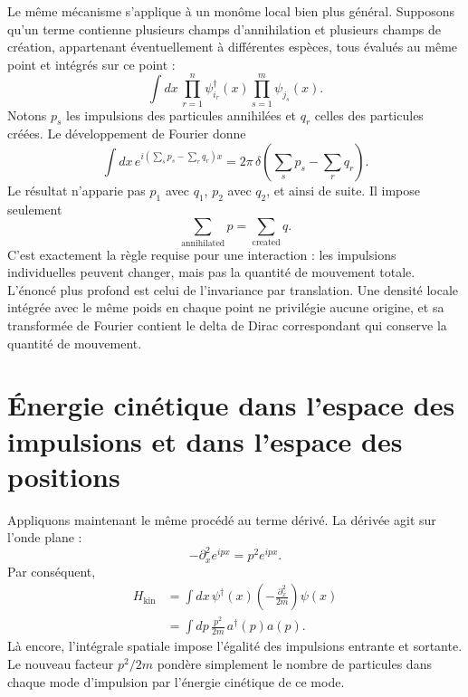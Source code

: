Le même mécanisme s’applique à un monôme local bien plus général. Supposons qu’un terme contienne plusieurs champs d’annihilation et plusieurs champs de création, appartenant éventuellement à différentes espèces, tous évalués au même point et intégrés sur ce point :
\begin{equation}
\int dx\,
\prod_{r=1}^{n} \psi_{i_r}^\dagger(x)
\prod_{s=1}^{m} \psi_{j_s}(x).
\end{equation}
Notons \(p_s\) les impulsions des particules annihilées et \(q_r\) celles des particules créées. Le développement de Fourier donne
\begin{equation}
\int dx\,
e^{i(\sum_s p_s-\sum_r q_r)x}
=2\pi\,
\delta\!\left(\sum_s p_s-\sum_r q_r\right).
\label{eq:l9-total-momentum-delta}
\end{equation}
Le résultat n’apparie pas \(p_1\) avec \(q_1\), \(p_2\) avec \(q_2\), et ainsi de suite. Il impose seulement
\begin{equation}
\sum_{\mathrm{annihilated}}p
=
\sum_{\mathrm{created}}q.
\end{equation}
C’est exactement la règle requise pour une interaction : les impulsions individuelles peuvent changer, mais pas la quantité de mouvement totale. L’énoncé plus profond est celui de l’invariance par translation. Une densité locale intégrée avec le même poids en chaque point ne privilégie aucune origine, et sa transformée de Fourier contient le delta de Dirac correspondant qui conserve la quantité de mouvement.

\begin{classroomqa}
\end{classroomqa}

\section{Énergie cinétique dans l’espace des impulsions et dans l’espace des positions}

Appliquons maintenant le même procédé au terme dérivé. La dérivée agit sur l’onde plane :
\begin{equation}
-\partial_x^2 e^{ipx}=p^2e^{ipx}.
\end{equation}
Par conséquent,
\begin{align}
H_{\mathrm{kin}}
&=\int dx\,\psi^\dagger(x)
\left(-\frac{\partial_x^2}{2m}\right)\psi(x)\\
&=\int dp\,\frac{p^2}{2m}\,a^\dagger(p)a(p).
\label{eq:l9-kinetic-momentum}
\end{align}
Là encore, l’intégrale spatiale impose l’égalité des impulsions entrante et sortante. Le nouveau facteur \(p^2/2m\) pondère simplement le nombre de particules dans chaque mode d’impulsion par l’énergie cinétique de ce mode.

